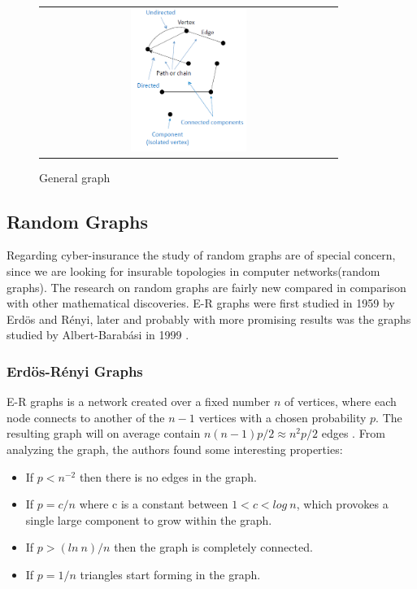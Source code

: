 \begin{figure}
\centering
\begin{tabular}{@{}c@{}}
\includegraphics[width=0.4\textwidth]{../Figures/generalGraph.png}
\end{tabular}
\caption{\label{fig:generalGraph} General graph \cite{audestad}}
\end{figure}


\subsection{Random Graphs}

Regarding cyber-insurance the study of random graphs are of special concern, since we are looking for insurable topologies in computer networks(random graphs). The research on random graphs are fairly new compared in comparison with other mathematical discoveries. E-R graphs were first studied in 1959 by Erdös and Rényi, later and probably with more promising results was the graphs studied by Albert-Barabási in 1999 \cite{audestad}. 

\subsubsection{Erdös-Rényi Graphs}
E-R graphs is a network created over a fixed number $n$ of vertices, where each node connects to another of the $n-1$ vertices with a chosen 
probability $p$. The resulting graph will on average contain $n(n-1)p/2 \approx n^{2}p/2$ edges \cite{barabasi}. 
From analyzing the graph, the authors found some interesting properties\cite{barabasi}\cite{audestad}:

\begin{itemize}
\item If $p<n^{-2}$  then there is no edges in the graph. 
\item If $p=c/n$ where c is a constant between $1 < c < log\: n$, which provokes a single large component to grow within the graph.
\item If $p>(ln\: n)/n$ then the graph is completely connected. 
\item If $p = 1/n$ triangles start forming in the graph. 
\end{itemize}

